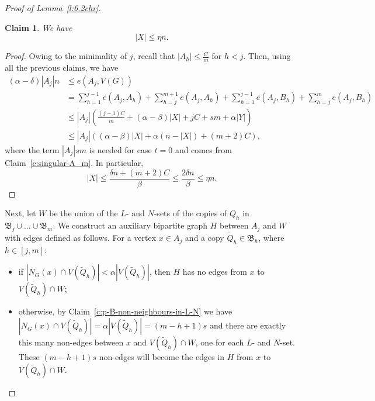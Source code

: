 \documentclass[reqno, 12pt]{amsart}
\numberwithin{equation}{section}
\numberwithin{figure}{section}
\theoremstyle{plain}
\newtheorem{claim}[thm]{Claim}
\theoremstyle{definition}
\def\fB{\mathfrak{B}}
\begin{document}
\begin{proof}[Proof of Lemma~\ref{l:6.2chr}]
        \begin{claim}\label{c:X_is_not_too_large} We have
            $$|X|\leq \eta n.$$
        \end{claim}
        \begin{proof}
            Owing to the minimality of $j$, recall that $|A_h| \leq \frac{C}{m}$ for $h<j$. Then, using all the previous claims, we have
            \begin{align*}
                (\alpha-\delta)|A_j|n & \leq  e(A_j,V(G))\\
                &= \sum_{h=1}^{j-1}e(A_j,A_h)+\sum_{h=j}^{m+1}e(A_j,A_h)+\sum_{h=1}^{j-1} e(A_j, B_h)+\sum_{h=j}^m e(A_j, B_h) \\
                & \leq |A_j|\left(\frac{(j-1)C}{m} + (\alpha-\beta)|X|+jC +sm+\alpha|Y|\right)\\
                & \leq |A_j|\left((\alpha-\beta) |X|+\alpha (n-|X|)+(m+2)C\right),
            \end{align*}
            where the term $|A_j|sm$ is needed for case $t=0$ and comes from Claim~\ref{c:singular-A_m}.
            In particular,
            \[|X|\leq \frac{\delta n +(m+2)C}{\beta}\leq \frac{2\delta n}{\beta}\leq \eta n.\]
        \end{proof}

        Next, let $W$ be the union of the $L$- and $N$-sets of the copies of $Q_h$ in $\fB_j\cup\dots\cup\fB_m$. We construct an auxiliary bipartite graph $H$ between $A_j$ and $W$ with edges defined as follows. For a vertex $x\in A_j$ and a copy $\tilde Q_h\in \fB_h$, where $h\in [j,m]$:
        \begin{itemize}
            \item if $|N_G(x)\cap V(\tilde Q_h)|<\alpha |V(\tilde Q_h)|$, then $H$ has no edges from $x$ to $V(\tilde Q_h) \cap W$;
            \item otherwise, by Claim~\ref{c:p-B-non-neighbours-in-L-N} we have $|N_G(x)\cap V(\tilde Q_h)|=\alpha |V(\tilde Q_h)|=(m-h+1)s$ and there are exactly this many non-edges between $x$ and $V(\tilde Q_h)\cap W$, one for each $L$- and $N$-set. These $(m-h+1)s$ non-edges will become the edges in $H$ from $x$ to $V(\tilde Q_h)\cap W$. 
        \end{itemize}


\end{proof}
\end{document}
